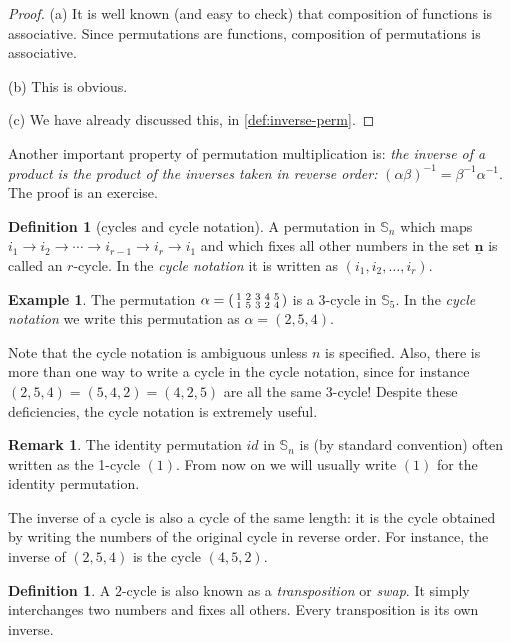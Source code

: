 \documentclass[11pt]{article}
\theoremstyle{definition}
\newtheorem{defn}[thm]{Definition}
\newtheorem{example}[thm]{Example}
\newtheorem{rmk}[thm]{Remark}
\newcommand{\n}{\underline{\mathbf{n}}}
\newcommand{\Sym}{\mathbb{S}}
\newenvironment{perm}[2]{\left(\begin{smallmatrix}#1 \\ #2}{\end{smallmatrix}\right)}
\begin{document}
\begin{proof}
(a) It is well known (and easy to check) that composition of functions
  is associative. Since permutations are functions, composition of
  permutations is associative.

(b) This is obvious. 

(c) We have already discussed this, in \ref{def:inverse-perm}.
\end{proof}

Another important property of permutation multiplication is: \emph{the
  inverse of a product is the product of the inverses taken in reverse
  order:} $(\alpha\beta)^{-1} = \beta^{-1}\alpha^{-1}$. The proof is
an exercise.


\begin{defn}[cycles and cycle notation]
  A permutation in $\Sym_n$ which maps $i_1 \to i_2 \to \cdots \to
  i_{r-1} \to i_r \to i_1$ and which fixes all other numbers in the
  set $\n$ is called an $r$-cycle. In the \emph{cycle notation} it is
  written as $(i_1, i_2, \dots, i_r)$.
\end{defn}

\begin{example}
  The permutation $\alpha =
  \begin{perm}{1&2&3&4&5}{1&5&3&2&4}\end{perm}$
  is a $3$-cycle in $\Sym_5$. In the {\em cycle notation} we write this
  permutation as $\alpha = (2,5,4)$.
\end{example}

Note that the cycle notation is ambiguous unless $n$ is
specified. Also, there is more than one way to write a cycle in the
cycle notation, since for instance $(2,5,4) = (5,4,2) = (4,2,5)$ are
all the same 3-cycle! Despite these deficiencies, the cycle notation
is extremely useful. 

\begin{rmk}
  The identity permutation $id$ in $\Sym_n$ is (by standard
  convention) often written as the 1-cycle $(1)$. From now on we will
  usually write $(1)$ for the identity permutation.
\end{rmk}


The inverse of a cycle is also a cycle of the same length: it is the
cycle obtained by writing the numbers of the original cycle in reverse
order. For instance, the inverse of $(2,5,4)$ is the cycle $(4,5,2)$. 

\begin{defn}
A $2$-cycle is also known as a {\em transposition} or \emph{swap}. It
simply interchanges two numbers and fixes all others. Every
transposition is its own inverse.
\end{defn} 
\end{document}
